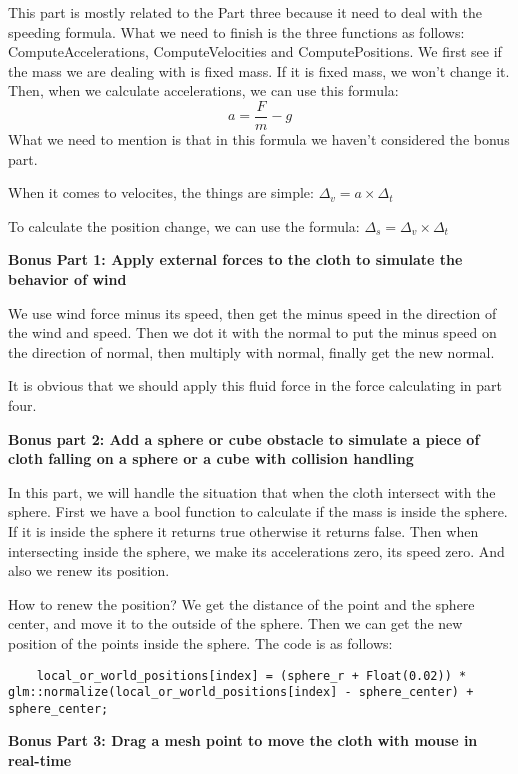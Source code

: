 \documentclass[acmtog]{acmart}
\begin{document}
This part is mostly related to the Part three because it need to deal with the speeding formula. What we need to finish is the three functions as follows: ComputeAccelerations, ComputeVelocities and ComputePositions. We first see if the mass we are dealing with is fixed mass. If it is fixed mass, we won't change it. \\
Then, when we calculate accelerations, we can use this formula:
$$a=\frac{F}{m}-g$$
What we need to mention is that in this formula we haven't considered the bonus part.

When it comes to velocites, the things are simple: $\Delta_v = a\times \Delta_t$

To calculate the position change, we can use the formula: $\Delta_s = \Delta_v \times \Delta_t$

\textbf{Bonus Part 1: Apply external forces to the cloth to simulate the behavior of wind}

We use wind force minus its speed, then get the minus speed in the direction of the wind and speed. Then we dot it with the normal to put the minus speed on the direction of normal, then multiply with normal, finally get the new normal. 

It is obvious that we should apply this fluid force in the force calculating in part four.

\textbf{Bonus part 2: Add a sphere or cube obstacle to simulate a piece of cloth falling on a sphere or a cube with collision handling}

In this part, we will handle the situation that when the cloth intersect with the sphere. First we have a bool function to calculate if the mass is inside the sphere. If it is inside the sphere it returns true otherwise it returns false. Then when intersecting inside the sphere, we make its accelerations zero, its speed zero. And also we renew its position.

How to renew the position? We get the distance of the point and the sphere center, and move it to the outside of the sphere. Then we can get the new position of the points inside the sphere. The code is as follows:

\begin{lstlisting}
    local_or_world_positions[index] = (sphere_r + Float(0.02)) * glm::normalize(local_or_world_positions[index] - sphere_center) + sphere_center;
\end{lstlisting}

\textbf{Bonus Part 3: Drag a mesh point to move the cloth with mouse in real-time}
\end{document}
